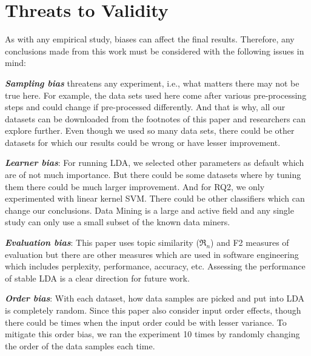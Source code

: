 \documentclass[twocolumn,5p,sort&compress]{elsarticle}
\theoremstyle{break}
\begin{document}
\section{Threats to Validity}
\label{sect:validity}

As with any empirical study, biases can affect the final
results. Therefore, any conclusions made from this work must be considered with the following issues in mind:

\textbf{\textit{Sampling bias}} threatens any experiment, i.e., what matters there may not be true here. For example,
the data sets used here come after various pre-processing steps and could change if pre-processed differently. And that is why, all our datasets can be downloaded from the footnotes of this paper and researchers can explore further. Even though we used so many data sets, there could be other datasets for which our results could be wrong or have lesser improvement.

\textbf{\textit{Learner bias}}: For running LDA, we selected other parameters as default which are of not much importance. But there could be some datasets where by tuning them there could be much larger improvement. And for RQ2, we only experimented with linear kernel SVM. There could be other classifiers which can change our conclusions. Data Mining is a large and active field and any single study can only use a small subset of the known data miners.

\textbf{\textit{Evaluation bias}}: This paper uses topic similarity ($\Re_n$) and F2 measures of evaluation but there are other measures which are used in software engineering which
includes perplexity, performance, accuracy, etc. Assessing
the performance of stable LDA is a clear direction for future work.

\textbf{\textit{Order bias}}: With each dataset, how data samples are picked and put into LDA is completely random. Since this paper also consider input order effects, though there could be times when the input order could be with lesser variance. To mitigate this order bias, we ran the experiment 10 times by randomly changing the order of the data samples each time.
\end{document}
